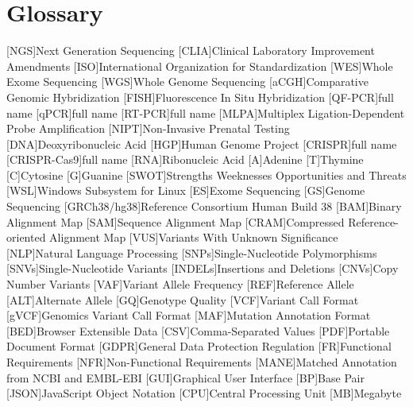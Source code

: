 \chapter{Glossary}

\footnotesize
\SingleSpacing

\begin{multicols}{2}
\begin{acronym}[AAAAAA]

	[NGS]{Next Generation Sequencing}
	[CLIA]{Clinical Laboratory Improvement Amendments}
	[ISO]{International Organization for Standardization}
	[WES]{Whole Exome Sequencing}
	[WGS]{Whole Genome Sequencing}
	[aCGH]{Comparative Genomic Hybridization}
	[FISH]{Fluorescence In Situ Hybridization}
	[QF-PCR]{full name}
	[qPCR]{full name}
	[RT-PCR]{full name}
	[MLPA]{Multiplex Ligation-Dependent Probe Amplification}
	[NIPT]{Non-Invasive Prenatal Testing}
	[DNA]{Deoxyribonucleic Acid}
	[HGP]{Human Genome Project}
	[CRISPR]{full name}
	[CRISPR-Cas9]{full name}
	[RNA]{Ribonucleic Acid}
	{Adenine}
	{Thymine}
	{Cytosine}
	{Guanine}
	[SWOT]{Strengths Weeknesses Opportunities and Threats}
	[WSL]{Windows Subsystem for Linux}
	[ES]{Exome Sequencing}
	[GS]{Genome Sequencing}
	[GRCh38/hg38]{Reference Consortium Human Build 38}
	[BAM]{Binary Alignment Map}
	[SAM]{Sequence Alignment Map}
	[CRAM]{Compressed Reference-oriented Alignment Map}
	[VUS]{Variants With Unknown Significance}
	[NLP]{Natural Language Processing}
	[SNPs]{Single-Nucleotide Polymorphisms}
	[SNVs]{Single-Nucleotide Variants}
	[INDELs]{Insertions and Deletions}
	[CNVs]{Copy Number Variants}
	[VAF]{Variant Allele Frequency}
	[REF]{Reference Allele}
	[ALT]{Alternate Allele}
	[GQ]{Genotype Quality}
	[VCF]{Variant Call Format}
	[gVCF]{Genomics Variant Call Format}
	[MAF]{Mutation Annotation Format}
	[BED]{Browser Extensible Data}
	[CSV]{Comma-Separated Values}
	[PDF]{Portable Document Format}
	[GDPR]{General Data Protection Regulation}
	[FR]{Functional Requirements}
	[NFR]{Non-Functional Requirements}
	[MANE]{Matched Annotation from NCBI and EMBL-EBI}
	[GUI]{Graphical User Interface}
	[BP]{Base Pair}
	[JSON]{JavaScript Object Notation}
	[CPU]{Central Processing Unit}
	[MB]{Megabyte}


\end{acronym}
\end{multicols}

